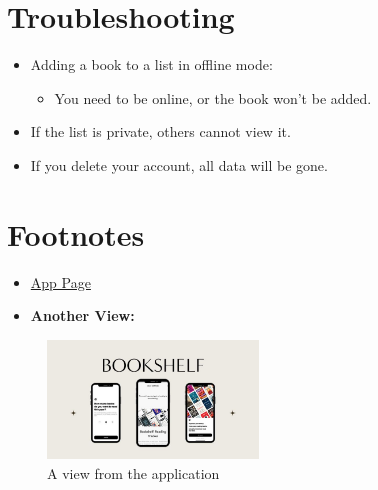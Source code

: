 \documentclass{article}
\begin{document}
\section*{Troubleshooting}
\begin{itemize}
    \item Adding a book to a list in offline mode:
    \begin{itemize}
        \item You need to be online, or the book won't be added.
    \end{itemize}
    \item If the list is private, others cannot view it.
    \item If you delete your account, all data will be gone.
\end{itemize}

\section*{Footnotes}
\begin{itemize}
    \item \href{https://a.storyblok.com/f/178313/491x424/0752fdbf6d/frame-415.webp}{App Page}
    \item \textbf{Another View:}
\end{itemize}

\begin{figure}[h]
    \centering
    \includegraphics[width=0.5\textwidth]{image.jpg} 
    \caption{A view from the application}
\end{figure}
\end{document}
